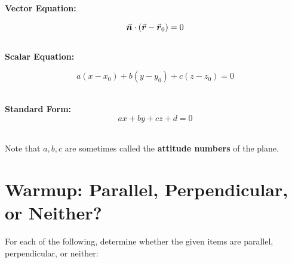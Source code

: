 \textbf{Vector Equation:}

\[
\n \cdot (\r- \r_0) = 0
\]
~\\

\textbf{Scalar Equation:}

\[
a(x-x_0) + b(y-y_0) + c(z-z_0) = 0
\]

~\\

\textbf{Standard Form:}\\

\[
ax + by + cz +d = 0
\]

~\\


Note that \(a, b, c\) are sometimes called the \textbf{attitude numbers} of the plane.




\section*{Warmup: Parallel, Perpendicular, or Neither?}
For each of the following, determine whether the given items are parallel, perpendicular, or neither:


